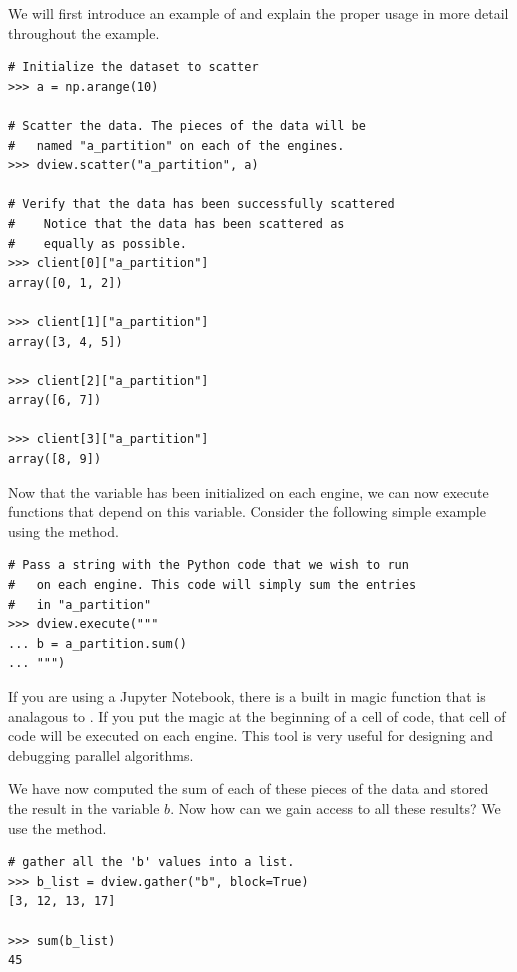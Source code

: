 We will first introduce an example of  and explain the proper usage in more detail throughout the example.

\begin{lstlisting}
# Initialize the dataset to scatter
>>> a = np.arange(10)

# Scatter the data. The pieces of the data will be
#   named "a_partition" on each of the engines.
>>> dview.scatter("a_partition", a)

# Verify that the data has been successfully scattered
#    Notice that the data has been scattered as
#    equally as possible.
>>> client[0]["a_partition"]
array([0, 1, 2])

>>> client[1]["a_partition"]
array([3, 4, 5])

>>> client[2]["a_partition"]
array([6, 7])

>>> client[3]["a_partition"]
array([8, 9])
\end{lstlisting}

Now that the  variable has been initialized on each engine, we can now execute functions that depend on this variable. Consider the following simple example using the  method.

\begin{lstlisting}
# Pass a string with the Python code that we wish to run
#   on each engine. This code will simply sum the entries
#   in "a_partition"
>>> dview.execute("""
... b = a_partition.sum()
... """)
\end{lstlisting}

\begin{info}
If you are using a Jupyter Notebook, there is a built in magic function that is analagous to . If you put the  magic at the beginning of a cell of code, that cell of code will be executed on each engine. This tool is very useful for designing and debugging parallel algorithms.
\end{info}


We have now computed the sum of each of these pieces of the data and stored the result in the variable $b$. Now how can we gain access to all these results? We use the  method.

\begin{lstlisting}
# gather all the 'b' values into a list.
>>> b_list = dview.gather("b", block=True)
[3, 12, 13, 17]

>>> sum(b_list)
45
\end{lstlisting}

